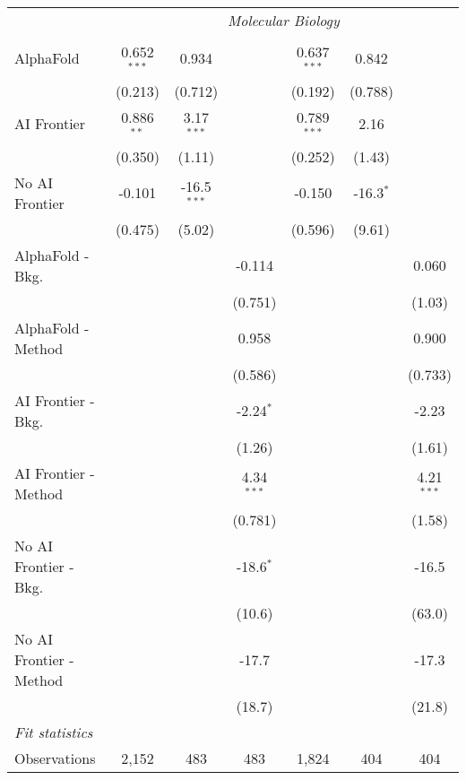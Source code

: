 \begin{tabular}{lcccccc}
 & \multicolumn{6}{c}{\textit{Molecular Biology}} \\ \\
   AlphaFold               & 0.652$^{***}$ & 0.934         &              & 0.637$^{***}$ & 0.842       &   \\   
                           & (0.213)       & (0.712)       &              & (0.192)       & (0.788)     &   \\   
   AI Frontier             & 0.886$^{**}$  & 3.17$^{***}$  &              & 0.789$^{***}$ & 2.16        &   \\   
                           & (0.350)       & (1.11)        &              & (0.252)       & (1.43)      &   \\   
   No AI Frontier          & -0.101        & -16.5$^{***}$ &              & -0.150        & -16.3$^{*}$ &   \\   
                           & (0.475)       & (5.02)        &              & (0.596)       & (9.61)      &   \\   
   AlphaFold - Bkg.        &               &               & -0.114       &               &             & 0.060\\   
                           &               &               & (0.751)      &               &             & (1.03)\\   
   AlphaFold - Method      &               &               & 0.958        &               &             & 0.900\\   
                           &               &               & (0.586)      &               &             & (0.733)\\   
   AI Frontier - Bkg.      &               &               & -2.24$^{*}$  &               &             & -2.23\\   
                           &               &               & (1.26)       &               &             & (1.61)\\   
   AI Frontier - Method    &               &               & 4.34$^{***}$ &               &             & 4.21$^{***}$\\   
                           &               &               & (0.781)      &               &             & (1.58)\\   
   No AI Frontier - Bkg.   &               &               & -18.6$^{*}$  &               &             & -16.5\\   
                           &               &               & (10.6)       &               &             & (63.0)\\   
   No AI Frontier - Method &               &               & -17.7        &               &             & -17.3\\   
                           &               &               & (18.7)       &               &             & (21.8)\\   
   \midrule
   \emph{Fit statistics}\\
   Observations            & 2,152         & 483           & 483          & 1,824         & 404         & 404\\  
   

\end{tabular}
